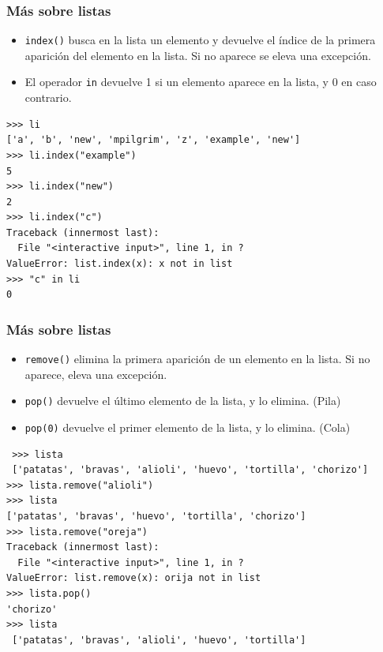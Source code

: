\documentclass{beamer}
\begin{document}
\begin{frame}[fragile]
\frametitle{Más sobre listas}

\begin{itemize}
\item \verb|index()| busca en la lista un elemento y devuelve el
  índice de la primera aparición del elemento en la lista. Si no
  aparece se eleva una excepción.
\item El operador \verb|in| devuelve 1 si un elemento aparece en la
  lista, y 0 en caso contrario.
\end{itemize}

\begin{footnotesize}
\begin{verbatim}
>>> li
['a', 'b', 'new', 'mpilgrim', 'z', 'example', 'new']
>>> li.index("example") 
5
>>> li.index("new")     
2
>>> li.index("c")       
Traceback (innermost last):
  File "<interactive input>", line 1, in ?
ValueError: list.index(x): x not in list
>>> "c" in li           
0
\end{verbatim}
\end{footnotesize}

\end{frame}




\begin{frame}[fragile]
\frametitle{Más sobre listas}

\begin{itemize}
\item \verb|remove()| elimina la primera aparición de un elemento en
  la lista. Si no aparece, eleva una excepción.
\item \verb|pop()| devuelve el último elemento de la lista, y lo elimina. (Pila) 
\item \verb|pop(0)| devuelve el primer elemento de la lista, y lo elimina. (Cola)
\end{itemize}

\begin{footnotesize}
\begin{verbatim}
 >>> lista
 ['patatas', 'bravas', 'alioli', 'huevo', 'tortilla', 'chorizo']
>>> lista.remove("alioli") 
>>> lista
['patatas', 'bravas', 'huevo', 'tortilla', 'chorizo']
>>> lista.remove("oreja")   
Traceback (innermost last):
  File "<interactive input>", line 1, in ?
ValueError: list.remove(x): orija not in list
>>> lista.pop()         
'chorizo'
>>> lista
 ['patatas', 'bravas', 'alioli', 'huevo', 'tortilla']
\end{verbatim}
\end{footnotesize}

\end{frame}
\end{document}
